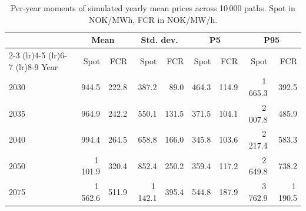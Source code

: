 \begin{table}[ht]
\centering
\caption{Per-year moments of simulated yearly mean prices across 10\,000 paths. Spot in NOK/MWh, FCR in NOK/MW/h.}
\label{tab:yearly-moments}
\begin{tabular}{lrrrrrrrr}
\toprule
 & \multicolumn{2}{c}{Mean} & \multicolumn{2}{c}{Std. dev.} & \multicolumn{2}{c}{P5} & \multicolumn{2}{c}{P95} \\
\cmidrule(lr){2-3} \cmidrule(lr){4-5} \cmidrule(lr){6-7} \cmidrule(lr){8-9}
Year & Spot & FCR & Spot & FCR & Spot & FCR & Spot & FCR \\
\midrule
  2030 & 944.5 & 222.8 & 387.2 & 89.0 & 464.3 & 114.9 & 1\,665.3 & 392.5 \\
  2035 & 964.9 & 242.2 & 550.1 & 131.5 & 371.5 & 104.1 & 2\,007.8 & 485.9 \\
  2040 & 994.4 & 264.5 & 658.8 & 166.0 & 345.8 & 103.6 & 2\,217.4 & 583.3 \\
  2050 & 1\,101.9 & 320.4 & 852.4 & 250.2 & 359.4 & 117.2 & 2\,649.8 & 738.2 \\
  2075 & 1\,562.6 & 511.9 & 1\,142.1 & 395.4 & 544.8 & 187.9 & 3\,762.9 & 1\,190.5 \\
\bottomrule
\end{tabular}
\end{table}
